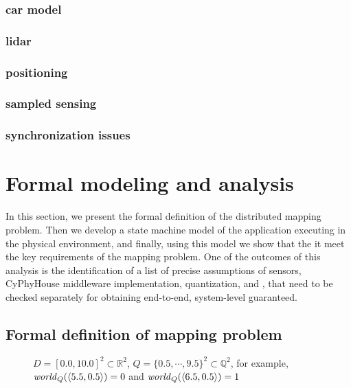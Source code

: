 \subsubsection{car model}
\subsubsection{lidar}
\subsubsection{positioning}
\subsubsection{sampled sensing}
\subsubsection{synchronization issues}

\section{Formal modeling and analysis}
\label{sec:formal}

In this section, we present the formal definition of the distributed mapping problem. Then we develop a state machine model of the \dmap application executing in the physical environment, and finally, using this model we show that the it meet the key requirements of the mapping problem. One of the outcomes of this analysis is the identification of a list of precise 
 assumptions of sensors, CyPhyHouse middleware implementation, quantization, and , that need to be checked separately for obtaining end-to-end, system-level guaranteed. 
 
\subsection{Formal definition of mapping problem}
\label{sec:prelims}

\begin{figure}[t]
\newcommand{\grid}[2]{\ensuremath{\langle#1,#2\rangle}}



\caption{$D = [0.0,10.0]^2 \subset \mathbb{R}^2$, $Q=\{0.5, \cdots, 9.5\}^2 \subset \mathbb{Q}^2$, for example, $\world_Q(\grid{5.5}{0.5}) = 0$ and $\world_Q(\grid{6.5}{0.5}) = 1$}
\end{figure}

